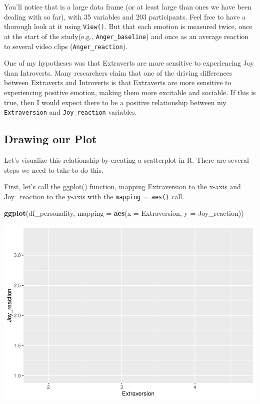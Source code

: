 \documentclass[
]{book}
\newenvironment{Shaded}{\begin{snugshade}}{\end{snugshade}}
\newcommand{\AttributeTok}[1]{\textcolor[rgb]{0.13,0.29,0.53}{#1}}
\newcommand{\FunctionTok}[1]{\textcolor[rgb]{0.13,0.29,0.53}{\textbf{#1}}}
\newcommand{\NormalTok}[1]{#1}
\begin{document}
You'll notice that is a large data frame (or at least large than ones we have been dealing with so far), with 35 variables and 203 participants. Feel free to have a thorough look at it using \texttt{View()}. But that each emotion is measured twice, once at the start of the study(e.g., \texttt{Anger\_baseline}) and once as an average reaction to several video clips (\texttt{Anger\_reaction}).

One of my hypotheses was that Extraverts are more sensitive to experiencing Joy than Introverts. Many researchers claim that one of the driving differences between Extraverts and Introverts is that Extraverts are more sensitive to experiencing positive emotion, making them more excitable and sociable. If this is true, then I would expect there to be a positive relationship between my \texttt{Extraversion} and \texttt{Joy\_reaction} variables.

\hypertarget{drawing-our-plot}{%
\subsection{Drawing our Plot}\label{drawing-our-plot}}

Let's visualize this relationship by creating a scatterplot in R. There are several steps we need to take to do this.

First, let's call the ggplot() function, mapping Extraversion to the x-axis and Joy\_reaction to the y-axis with the \texttt{mapping\ =\ aes()} call.

\begin{Shaded}
\begin{Highlighting}[]
\FunctionTok{ggplot}\NormalTok{(df\_personality, }\AttributeTok{mapping =} \FunctionTok{aes}\NormalTok{(}\AttributeTok{x =}\NormalTok{ Extraversion, }\AttributeTok{y =}\NormalTok{ Joy\_reaction))}
\end{Highlighting}
\end{Shaded}

\includegraphics{rintro_demo_files/figure-latex/unnamed-chunk-307-1.pdf}
\end{document}
